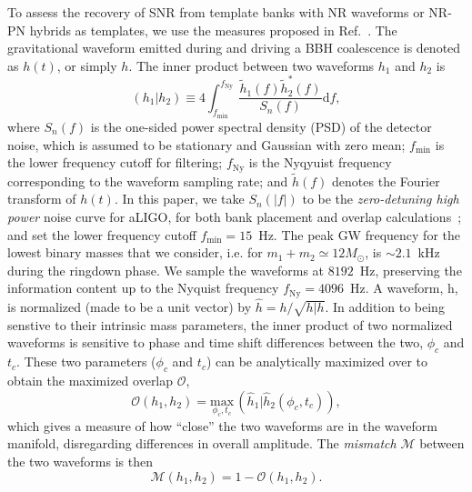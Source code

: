 \documentclass[aps,
prd,
twocolumn,
superscriptaddress,
lengthcheck,showpacs,letterpaper,nofootinbib,
floatfix]{revtex4-1}
\newcommand{\D}{\mathrm{d}}
\newcommand{\Olap}{\mathcal{O}}
\def\l({\left(}
\def\r){\right)}
\begin{document}
To assess the recovery of SNR from template banks with NR waveforms or NR-PN 
hybrids as templates, we use the measures proposed in
Ref.~\cite{FittingFactorApostolatos,Sathyaprakash:1991mt,Balasubramanian:1995bm}. 
The gravitational waveform emitted during and driving a BBH coalescence is
denoted as $h(t)$, or simply $h$. The inner product between two 
waveforms $h_1$ and $h_2$ is
\begin{equation}\label{eq:overlap}
(h_1|h_2) \equiv 
4\int^{f_\mathrm{Ny}}_{f_\mathrm{min}}\dfrac{\tilde{h}_1(f)\tilde{h}_2^*(f)}{S_n(f)}\D f,
\end{equation}
where $S_n(f)$ is the one-sided power spectral density (PSD) of the detector
noise, which is assumed to be stationary and Gaussian with zero mean; 
$f_\mathrm{min}$ is the lower frequency cutoff for filtering; $f_\mathrm{Ny}$
is the Nyqyuist frequency corresponding to the waveform sampling rate; and 
$\tilde{h}(f)$ denotes the Fourier transform of $h(t)$.
In this paper, we take $S_n(|f|)$ to be the \textit{zero-detuning high power} 
noise curve for aLIGO, for both bank placement and overlap
calculations~\cite{aLIGONoiseCurve}; and set the lower frequency cutoff 
$f_\mathrm{min} =15$~Hz. The peak GW frequency for the lowest binary masses
that we consider, i.e. for $m_1+m_2\simeq 12M_\odot$, is $\sim 2.1$~kHz during
the ringdown phase. We sample the waveforms at $8192$~Hz, preserving the 
information content up to the Nyquist frequency $f_\mathrm{Ny}=4096$~Hz.
A waveform, h, is normalized (made to be a unit vector) by 
$\hat{h} = h/\sqrt{h | h}$. In addition to being senstive to their 
intrinsic mass parameters, the inner product of two normalized waveforms is 
sensitive to phase and time shift differences between the two, $\phi_{c}$ and
$t_{c}$.  These two parameters ($\phi_c$ and $t_c$) can be analytically
maximized over to obtain the maximized overlap $\Olap$,
\begin{equation}\label{eq:maxnormolap}
\Olap(h_1,h_2) = 
\underset{\phi_c,t_c}{\mathrm{max}}\,\l(\hat{h}_1|\hat{h}_2(\phi_c,t_c)\r),
\end{equation}
which gives a measure of how ``close'' the two waveforms are in the waveform
manifold, disregarding differences in overall amplitude. The \textit{mismatch}
$\mathcal{M}$ between the two waveforms is then
\begin{equation}\label{eq:mismatch}
\mathcal{M}(h_1,h_2) = 1 - \Olap(h_1,h_2).
\end{equation}
\end{document}
